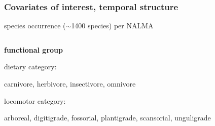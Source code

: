 \documentclass[aspectratio=169]{beamer}
\begin{document}
\begin{frame}
  \frametitle{Covariates of interest, temporal structure}

  \begin{center}
    \large{species occurrence (\(\sim\)1400 species) per NALMA}
  \end{center}

  \vspace*{0.05\textheight}

  \begin{columns}
    \begin{column}[T]{0.3\textwidth}
      \textbf{functional group}
      \begin{itemize}
        \small{
        \item dietary category: \\\begin{tiny}carnivore, herbivore, insectivore, omnivore\end{tiny}
        \item locomotor category: \\\begin{tiny}arboreal, digitigrade, fossorial, plantigrade, scansorial, unguligrade\end{tiny}
        }
      \end{itemize}
  
      \vspace*{0.01\textheight}


\end{column}
\end{columns}
\end{frame}
\end{document}
